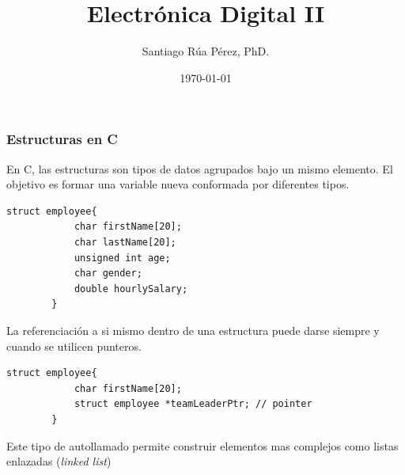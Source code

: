 \documentclass[10.5pt,scale=1.0,t,aspectratio=169,hyperref={pdfpagelabels=false}]{beamer}
\title{Electrónica Digital II}
\author{Santiago Rúa Pérez, PhD.}
\date{\today}
\begin{document}
	\begin{frame}
		\titlepage
	\end{frame}
	\frame{
		\begin{center}
			\LARGE \textcolor{blue}{UNIONES, ESTRUCTURAS Y MANIPULACIÓN DE BITS EN C}
		\end{center}
		
	}

\begin{frame}[fragile]
\frametitle{Estructuras en C}
	En C, las estructuras son tipos de datos agrupados bajo un mismo elemento. El objetivo es formar una variable nueva conformada por diferentes tipos. 
	\begin{lstlisting}[style=CStyle]
		struct employee{
			char firstName[20];
			char lastName[20];
			unsigned int age;
			char gender;
			double hourlySalary;
		}
	\end{lstlisting}
	La referenciación a si mismo dentro de una estructura puede darse siempre y cuando se utilicen punteros. 
	
	\begin{lstlisting}[style=CStyle]
		struct employee{
			char firstName[20];
			struct employee *teamLeaderPtr; // pointer
		}
	\end{lstlisting}

	Este tipo de autollamado permite construir elementos mas complejos como listas enlazadas (\textit{linked list})
\end{frame}
\end{document}
